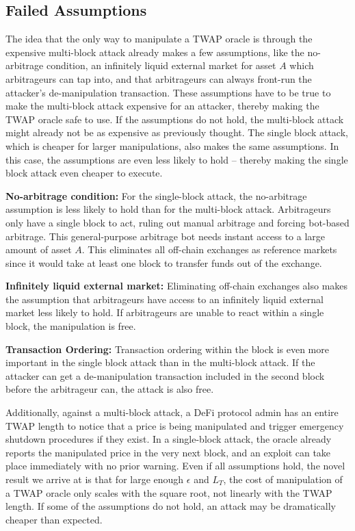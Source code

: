 \documentclass[conference]{IEEEtran}
\begin{document}
\subsection{Failed Assumptions}
The idea that the only way to manipulate a TWAP oracle is through the expensive multi-block attack already makes a few assumptions, like the no-arbitrage condition, an infinitely liquid external market for asset $A$ which arbitrageurs can tap into, and that arbitrageurs can always front-run the attacker's de-manipulation transaction. These assumptions have to be true to make the multi-block attack expensive for an attacker, thereby making the TWAP oracle safe to use. If the assumptions do not hold, the multi-block attack might already not be as expensive as previously thought. The single block attack, which is cheaper for larger manipulations, also makes the same assumptions. In this case, the assumptions are even less likely to hold -- thereby making the single block attack even cheaper to execute.

\textbf{No-arbitrage condition:} For the single-block attack, the no-arbitrage assumption is less likely to hold than for the multi-block attack. Arbitrageurs only have a single block to act, ruling out manual arbitrage and forcing bot-based arbitrage. This general-purpose arbitrage bot needs instant access to a large amount of asset $A$. This eliminates all off-chain exchanges as reference markets since it would take at least one block to transfer funds out of the exchange.

\textbf{Infinitely liquid external market:} Eliminating off-chain exchanges also makes the assumption that arbitrageurs have access to an infinitely liquid external market less likely to hold. If arbitrageurs are unable to react within a single block, the manipulation is free.

\textbf{Transaction Ordering:} Transaction ordering within the block is even more important in the single block attack than in the multi-block attack. If the attacker can get a de-manipulation transaction included in the second block before the arbitrageur can, the attack is also free.
\bigskip

Additionally, against a multi-block attack, a DeFi protocol admin has an entire TWAP length to notice that a price is being manipulated and trigger emergency shutdown procedures if they exist. In a single-block attack, the oracle already reports the manipulated price in the very next block, and an exploit can take place immediately with no prior warning. Even if all assumptions hold, the novel result we arrive at is that for large enough $\epsilon$ and $L_T$, the cost of manipulation of a TWAP oracle only scales with the square root, not linearly with the TWAP length. If some of the assumptions do not hold, an attack may be dramatically cheaper than expected. 
\end{document}
